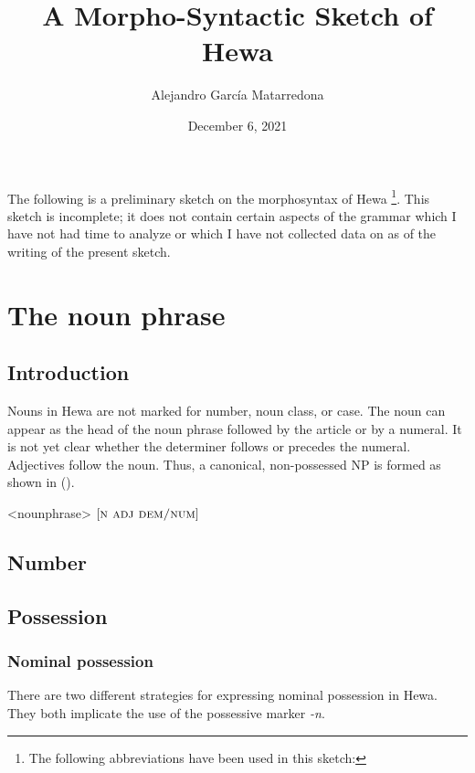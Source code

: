 \documentclass[12pt]{article}
\author{Alejandro García Matarredona}
\title{A Morpho-Syntactic Sketch of Hewa}
\date{December 6, 2021}
\begin{document}
\maketitle

\noindent The following is a preliminary sketch on the morphosyntax of Hewa \footnote{The following abbreviations have been used in this sketch: \printglossaries}. This sketch is incomplete; it does not contain certain aspects of the grammar which I have not had time to analyze or which I have not collected data on as of the writing of the present sketch.

\section{The noun phrase}\label{sec:nphr}

\subsection{Introduction}\label{sec:nphr.intr}

Nouns in Hewa are not marked for number, noun class, or case. The noun can appear as the head of the noun phrase followed by the article or by a numeral. It is not yet clear whether the determiner follows or precedes the numeral. Adjectives follow the noun. Thus, a canonical, non-possessed NP is formed as shown in ().

\ex<nounphrase>
$[\textsc{n adj dem/num}]$
\xe



\subsection{Number}

\subsection{Possession}

\subsubsection{Nominal possession}

There are two different strategies for expressing nominal possession in Hewa. They both implicate the use of the possessive marker \textit{-n}.
\end{document}
